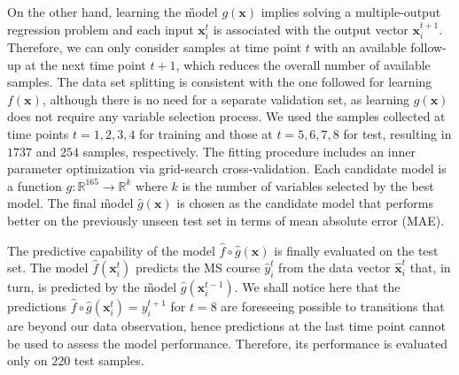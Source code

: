 On the other hand, learning the \G model $g(\bm{x})$ implies solving a multiple-output regression problem and each input $\bm{x}_i^t$ is associated with the output vector $\bm{x}_i^{t+1}$.
Therefore, we can only consider samples at time point $t$ with an available follow-up at the next time point $t+1$, which reduces the overall number of available samples.
The data set splitting is consistent with the one followed for learning $f(\bm{x})$, although there is no need for a separate validation set, as learning $g(\bm{x})$ does not require any variable selection process. We used the samples collected at time points $t=1,2,3,4$ for training and those at $t=5,6,7,8$ for test, resulting in $1737$ and $254$ samples, respectively.
The fitting procedure includes an inner parameter optimization via grid-search cross-validation. Each candidate model is a function
$g: \mathbb{R}^{165} \rightarrow \mathbb{R}^k$ where $k$ is the number of variables selected by the best \F model.
The final \G model $\hat{g}(\bm{x})$ is chosen as the candidate model that performs better on the previously unseen test set in terms of mean absolute error (MAE).


The predictive capability of the \FOG model $\hat{f} \circ \hat{g}(\bm{x})$ is finally evaluated on the test set. The \F model $\hat{f}(\bm{x}_i^t)$ predicts the MS course $\hat{y}_i^t$ from the \PCO data vector $\hat{\bm{x}}_i^t$ that, in turn, is predicted by the \G model $\hat{g}(\bm{x}_i^{t-1})$. We shall notice here that the predictions $\hat{f} \circ \hat{g}(\bm{x}_i^t)=y_i^{t+1}$ for $t=8$ are foreseeing possible \RR to \SP transitions that are beyond our data observation, hence predictions at the last time point cannot be used to assess the \FOG model performance. Therefore, its performance is evaluated only on $220$ test samples.

